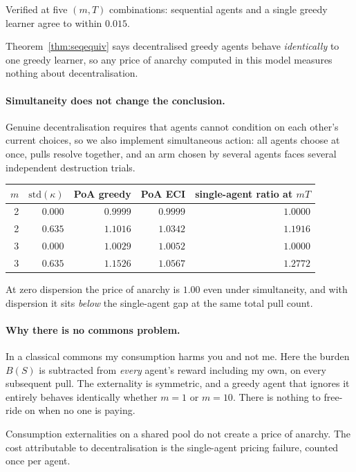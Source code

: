 Verified at five $(m,T)$ combinations: sequential agents and a single greedy
learner agree to within $0.015$.

Theorem~\ref{thm:seqequiv} says decentralised greedy agents behave \emph{identically}
to one greedy learner, so any price of anarchy computed in this model measures
nothing about decentralisation.

\paragraph{Simultaneity does not change the conclusion.} Genuine decentralisation
requires that agents cannot condition on each other's current choices, so we also
implement simultaneous action: all agents choose at once, pulls resolve together,
and an arm chosen by several agents faces several independent destruction trials.

\begin{center}
\begin{tabular}{rrrrr}
\toprule
$m$ & $\mathrm{std}(\kappa)$ & PoA greedy & PoA ECI & single-agent ratio at $mT$ \\
\midrule
2 & $0.000$ & $\mathbf{0.9999}$ & $0.9999$ & $1.0000$ \\
2 & $0.635$ & $1.1016$ & $1.0342$ & $1.1916$ \\
3 & $0.000$ & $\mathbf{1.0029}$ & $1.0052$ & $1.0000$ \\
3 & $0.635$ & $1.1526$ & $1.0567$ & $1.2772$ \\
\bottomrule
\end{tabular}
\end{center}

At zero dispersion the price of anarchy is $1.00$ even under simultaneity, and with
dispersion it sits \emph{below} the single-agent gap at the same total pull count.

\paragraph{Why there is no commons problem.} In a classical commons my consumption
harms you and not me. Here the burden $B(S)$ is subtracted from \emph{every}
agent's reward including my own, on every subsequent pull. The externality is
symmetric, and a greedy agent that ignores it entirely behaves identically whether
$m=1$ or $m=10$. There is nothing to free-ride on when no one is paying.

\begin{corollary}
Consumption externalities on a shared pool do not create a price of anarchy. The
cost attributable to decentralisation is the single-agent pricing failure, counted
once per agent.
\end{corollary}

